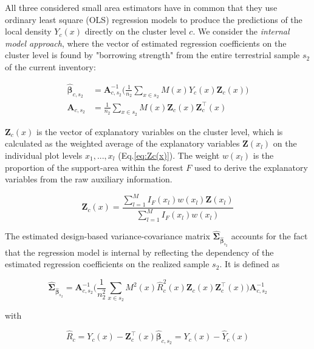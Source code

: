 All three considered small area estimators have in common that they use ordinary least square (OLS) regression models to produce the predictions of the local density $Y_{c}(x)$ directly on the cluster level $c$. We consider the \textit{internal model approach}, where the vector of estimated regression coefficients on the cluster level is found by "borrowing strength" from the entire terrestrial sample $s_2$ of the current inventory:

\begin{subequations}\label{normequ_simple_cluster}
	\begin{align}
\hat{\pmb{\beta}}_{c,s_2} &= \pmb{A}_{c,s_2}^{-1} \Big(\frac{1}{n_2}\sum_{x\in{s_2}}M(x)Y_{c}(x)\pmb{Z}_{c}(x)\Big) \\
\pmb{A}_{c,s_2} &=\frac{1}{n_2}\sum_{x\in{s_2}}M(x)\pmb{Z}_{c}(x)\pmb{Z}_{c}^{\top}(x)
	\end{align}
\end{subequations}

\noindent $\pmb{Z}_{c}(x)$ is the vector of explanatory variables on the cluster level, which is calculated as the weighted average of the explanatory variables $\pmb{Z}(x_l)$ on the individual plot levels $x_1, ..., x_l$ (Eq.\ref{eq:Zc(x)}). The weight $w(x_l)$ is the proportion of the support-area within the forest $F$ used to derive the explanatory variables from the raw auxiliary information.

\begin{equation}\label{eq:Zc(x)}
\pmb{Z}_{c}(x)=\frac{\sum_{l=1}^{M}I_{F}(x_l)w(x_l)\pmb{Z}(x_l)}{\sum_{l=1}^{M}I_{F}(x_l)w(x_l)}
\end{equation}

\noindent The estimated design-based variance-covariance matrix $\hat{\pmb{\Sigma}}_{\hat{\pmb{\beta}}_{s_2}}$ accounts for the fact that the regression model is internal by reflecting the dependency of the estimated regression coefficients on the realized sample $s_2$. It is defined as

\begin{equation}\label{eq:varcovarbeta}
\hat{\pmb{\Sigma}}_{\hat{\pmb{\beta}}_{s_2}}=\pmb{A}_{c,s_2}^{-1}
\Big(\frac{1}{n_2^2}\sum_{x\in{s_2}}M^{2}(x)\hat{R}_{c}^2(x)\pmb{Z}_{c}(x)\pmb{Z}_{c}^{\top}(x)\Big)
\pmb{A}_{c,s_2}^{-1}
\end{equation}

with 

\begin{equation}\label{eq:globresids}
\hat{R}_{c}=Y_{c}(x)-\pmb{Z}_{c}^{\top}(x)\hat{\pmb{\beta}}_{c,s_2} = Y_{c}(x) - \hat{Y}_{c}(x)
\end{equation}

